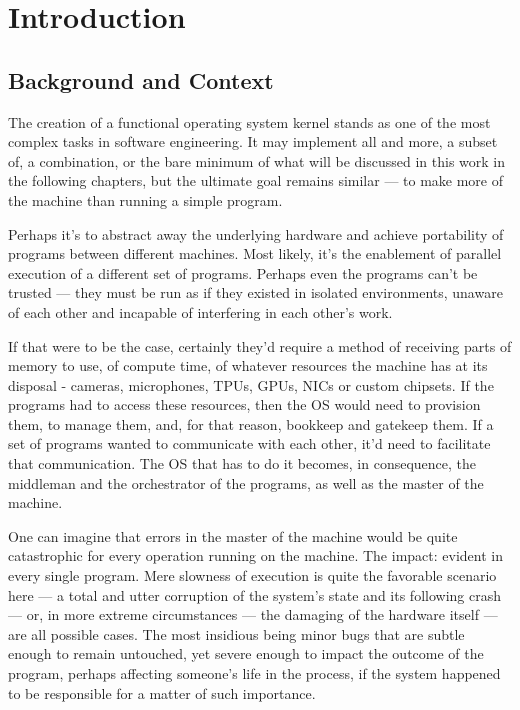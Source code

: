 \documentclass[a4paper,10pt,twoside]{report}
\theoremstyle{definition}
\begin{document}

\null\thispagestyle{empty}\newpage
\pagestyle{fancy}
\setcounter{page}{11}
\chapter{Introduction}
\label{chap:introduction}

\section{Background and Context}

The creation of a functional operating system kernel stands as one of the most complex tasks in software engineering. It may implement all and more, a subset of, a combination, or the bare minimum of what will be discussed in this work in the following chapters, but the ultimate goal remains similar --- to make more of the machine than running a simple program.

Perhaps it's to abstract away the underlying hardware and achieve portability of programs between different machines. Most likely, it's the enablement of parallel execution of a different set of programs. Perhaps even the programs can't be trusted --- they must be run as if they existed in isolated environments, unaware of each other and incapable of interfering in each other's work. 

If that were to be the case, certainly they'd require a method of receiving parts of memory to use, of compute time, of whatever resources the machine has at its disposal - cameras, microphones, TPUs, GPUs, NICs or custom chipsets. If the programs had to access these resources, then the OS would need to provision them, to manage them, and, for that reason, bookkeep and gatekeep them. If a set of programs wanted to communicate with each other, it'd need to facilitate that communication. The OS that has to do it becomes, in consequence, the middleman and the orchestrator of the programs, as well as the master of the machine.

One can imagine that errors in the master of the machine would be quite catastrophic for every operation running on the machine. The impact: evident in every single program. Mere slowness of execution is quite the favorable scenario here --- a total and utter corruption of the system's state and its following crash --- or, in more extreme circumstances --- the damaging of the hardware itself --- are all possible cases. The most insidious being minor bugs that are subtle enough to remain untouched, yet severe enough to impact the outcome of the program, perhaps affecting someone's life in the process, if the system happened to be responsible for a matter of such importance. 
\end{document}
